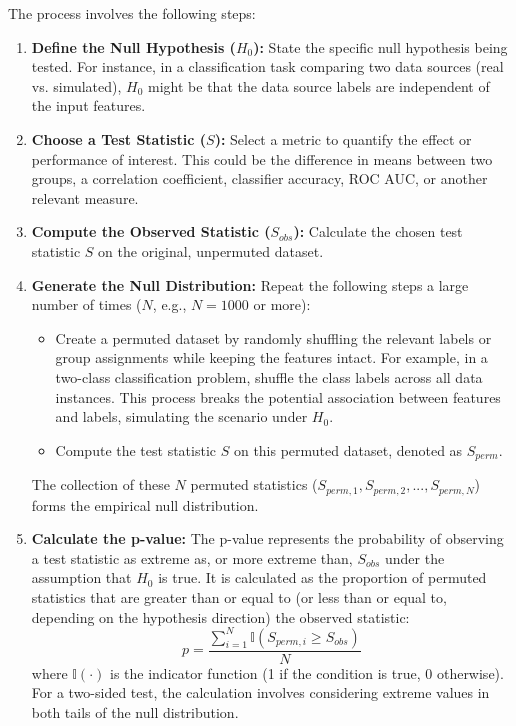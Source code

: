The process involves the following steps:

\begin{enumerate}
  \item \textbf{Define the Null Hypothesis ($H_0$):} State the specific null hypothesis being tested. For instance, in a classification task comparing two data sources (real vs. simulated), $H_0$ might be that the data source labels are independent of the input features.
  \item \textbf{Choose a Test Statistic ($S$):} Select a metric to quantify the effect or performance of interest. This could be the difference in means between two groups, a correlation coefficient, classifier accuracy, ROC AUC, or another relevant measure.
  \item \textbf{Compute the Observed Statistic ($S_{obs}$):} Calculate the chosen test statistic $S$ on the original, unpermuted dataset.
  \item \textbf{Generate the Null Distribution:} Repeat the following steps a large number of times ($N$, e.g., $N=1000$ or more):
        \begin{itemize}
          \item Create a permuted dataset by randomly shuffling the relevant labels or group assignments while keeping the features intact. For example, in a two-class classification problem, shuffle the class labels across all data instances. This process breaks the potential association between features and labels, simulating the scenario under $H_0$.
          \item Compute the test statistic $S$ on this permuted dataset, denoted as $S_{perm}$.
        \end{itemize}
        The collection of these $N$ permuted statistics ($S_{perm, 1}, S_{perm, 2}, ..., S_{perm, N}$) forms the empirical null distribution.
  \item \textbf{Calculate the p-value:} The p-value represents the probability of observing a test statistic as extreme as, or more extreme than, $S_{obs}$ under the assumption that $H_0$ is true. It is calculated as the proportion of permuted statistics that are greater than or equal to (or less than or equal to, depending on the hypothesis direction) the observed statistic:
        \begin{equation}
          p = \frac{\sum_{i=1}^{N} \mathbb{I}(S_{perm, i} \ge S_{obs})}{N}
          \label{eq:pvalue_perm}
        \end{equation}
        where $\mathbb{I}(\cdot)$ is the indicator function (1 if the condition is true, 0 otherwise). For a two-sided test, the calculation involves considering extreme values in both tails of the null distribution.

\end{enumerate}
